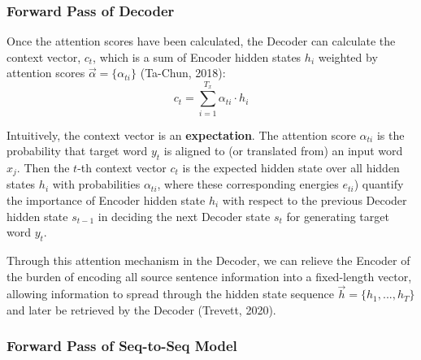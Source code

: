 

\subsubsection{Forward Pass of Decoder}

Once the attention scores have been calculated, the Decoder can calculate the context vector, $c_t$, which is a sum of Encoder hidden states $h_i$ weighted by attention scores $\overrightarrow{\alpha} = \Big \{ \alpha_{ti} \Big \}$ (Ta-Chun, 2018): 
$$
c_t = \sum_{i=1}^{T_x} \alpha_{ti} \cdot h_i
$$

Intuitively, the context vector is an \textbf{expectation}. The attention score $\alpha_{ti}$ is the probability that target word $y_t$ is aligned to (or translated from) an input word $x_j$. Then the $t$-th context vector $c_t$ is the expected hidden state over all hidden states $h_i$ with probabilities $\alpha_{ti}$, where these corresponding energies $e_{ti}$) quantify the importance of Encoder hidden state $h_i$ with respect to the previous Decoder hidden state $s_{t-1}$ in deciding the next Decoder state $s_t$ for generating target word $y_t$. \newline 

Through this attention mechanism in the Decoder, we can relieve the Encoder of the burden of encoding all source sentence information into a fixed-length vector, allowing information to spread through the hidden state sequence $\overrightarrow{h} = \Big \{ h_1,...,h_T\Big \}$ and later be retrieved by the Decoder (Trevett, 2020). \newline



\subsubsection{Forward Pass of Seq-to-Seq Model}

